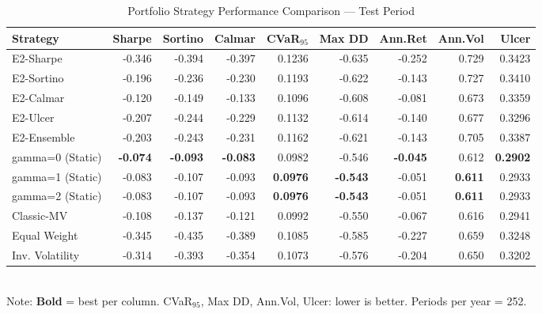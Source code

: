 \begin{table}[htbp]
\centering
\caption{Portfolio Strategy Performance Comparison — Test Period}
\label{tab:performance_comparison}
\begin{tabular}{lrrrrrrrr}
\toprule
Strategy & Sharpe & Sortino & Calmar & CVaR$_{95}$ & Max DD & Ann.Ret & Ann.Vol & Ulcer \\
\midrule
E2-Sharpe & -0.346 & -0.394 & -0.397 & 0.1236 & -0.635 & -0.252 & 0.729 & 0.3423 \\
E2-Sortino & -0.196 & -0.236 & -0.230 & 0.1193 & -0.622 & -0.143 & 0.727 & 0.3410 \\
E2-Calmar & -0.120 & -0.149 & -0.133 & 0.1096 & -0.608 & -0.081 & 0.673 & 0.3359 \\
E2-Ulcer & -0.207 & -0.244 & -0.229 & 0.1132 & -0.614 & -0.140 & 0.677 & 0.3296 \\
E2-Ensemble & -0.203 & -0.243 & -0.231 & 0.1162 & -0.621 & -0.143 & 0.705 & 0.3387 \\
gamma=0 (Static) & \textbf{-0.074} & \textbf{-0.093} & \textbf{-0.083} & 0.0982 & -0.546 & \textbf{-0.045} & 0.612 & \textbf{0.2902} \\
gamma=1 (Static) & -0.083 & -0.107 & -0.093 & \textbf{0.0976} & \textbf{-0.543} & -0.051 & \textbf{0.611} & 0.2933 \\
gamma=2 (Static) & -0.083 & -0.107 & -0.093 & \textbf{0.0976} & \textbf{-0.543} & -0.051 & \textbf{0.611} & 0.2933 \\
Classic-MV & -0.108 & -0.137 & -0.121 & 0.0992 & -0.550 & -0.067 & 0.616 & 0.2941 \\
Equal Weight & -0.345 & -0.435 & -0.389 & 0.1085 & -0.585 & -0.227 & 0.659 & 0.3248 \\
Inv. Volatility & -0.314 & -0.393 & -0.354 & 0.1073 & -0.576 & -0.204 & 0.650 & 0.3202 \\
\bottomrule
\end{tabular}
\\[-4pt]
{\footnotesize Note: \textbf{Bold} = best per column. CVaR$_{95}$, Max DD, Ann.Vol, Ulcer: lower is better. Periods per year = 252.}
\end{table}